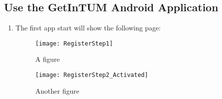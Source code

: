 

\subsection{Use the GetInTUM Android Application}
\begin{enumerate}
   \item The first app start will show the following page:
   \begin{figure}
   \centering
   \begin{minipage}{.5\textwidth}
     \centering
     \texttt{[image: RegisterStep1]}
     \caption{A figure}
     \label{fig:test1}
   \end{minipage}%
   \begin{minipage}{.5\textwidth}
     \centering
     \texttt{[image: RegisterStep2\_Activated]}
     \caption{Another figure}
     \label{fig:test2}
   \end{minipage}
   \end{figure}

\end{enumerate}
